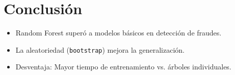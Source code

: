 \documentclass{article}
\begin{document}
\section{Conclusión}
\begin{itemize}
    \item Random Forest superó a modelos básicos en detección de fraudes.
    \item La aleatoriedad (\texttt{bootstrap}) mejora la generalización.
    \item Desventaja: Mayor tiempo de entrenamiento vs. árboles individuales.
\end{itemize}
\end{document}
